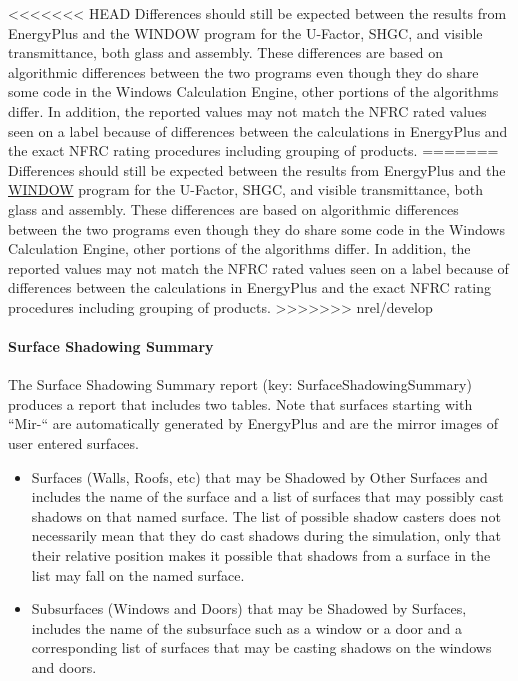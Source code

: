 <<<<<<< HEAD
Differences should still be expected between the results from EnergyPlus and the WINDOW program for the U-Factor, SHGC, and visible transmittance, both glass and assembly. These differences are based on algorithmic differences between the two programs even though they do share some code in the Windows Calculation Engine, other portions of the algorithms differ. In addition, the reported values may not match the NFRC rated values seen on a label because of differences between the calculations in EnergyPlus and the exact NFRC rating procedures including grouping of products.
=======
Differences should still be expected between the results from EnergyPlus and the \href{https://windows.lbl.gov/software-tools#window-heading}{WINDOW} program for the U-Factor, SHGC, and visible transmittance, both glass and assembly. These differences are based on algorithmic differences between the two programs even though they do share some code in the Windows Calculation Engine, other portions of the algorithms differ. In addition, the reported values may not match the NFRC rated values seen on a label because of differences between the calculations in EnergyPlus and the exact NFRC rating procedures including grouping of products.
>>>>>>> nrel/develop

\paragraph{Surface Shadowing Summary}\label{surface-shadowing-summary}

The Surface Shadowing Summary report (key: SurfaceShadowingSummary) produces a report that includes two tables. Note that surfaces starting with ``Mir-`` are automatically generated by EnergyPlus and are the mirror images of user entered surfaces.

\begin{itemize}
\item
  Surfaces (Walls, Roofs, etc) that may be Shadowed by Other Surfaces and includes the name of the surface and a list of surfaces that may possibly cast shadows on that named surface. The list of possible shadow casters does not necessarily mean that they do cast shadows during the simulation, only that their relative position makes it possible that shadows from a surface in the list may fall on the named surface.
\item
  Subsurfaces (Windows and Doors) that may be Shadowed by Surfaces, includes the name of the subsurface such as a window or a door and a corresponding list of surfaces that may be casting shadows on the windows and doors.
\end{itemize}

